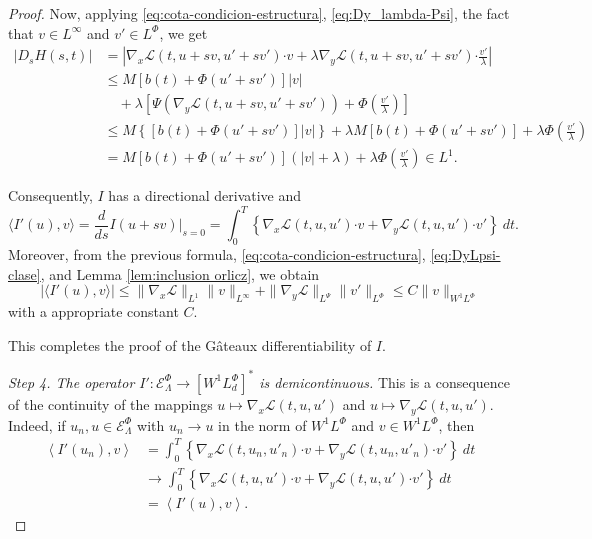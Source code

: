 \documentclass[twoside]{article}
\theoremstyle{remark}
\newcommand{\orlnor}{\|_{L^{\Phi}}}
\newcommand{\linf}{\|_{L^{\infty}}}
\newcommand{\lphi}{L^{\Phi}}
\newcommand{\lpsi}{L^{\Psi}}
\newcommand{\wphi}{W^{1}\lphi}
\newcommand{\sobnor}{\|_{W^{1}\lphi}}
\newcommand{\domi}{\mathcal{E}^{\Phi}}
\renewcommand{\b}[1]{\boldsymbol{#1}}
\newcommand{\ccdot}{\b{\cdot}}
\renewcommand{\leq}{\leqslant}
\begin{document}
\begin{proof}
Now, applying \eqref{eq:cota-condicion-estructura}, \eqref{eq:Dy_lambda-Psi},  
the fact that $v \in L^{\infty}$ and $v'\in\lphi$, 
we get
\begin{equation}\label{ctg}
\begin{split}
|D_s H(s,t)|&=\left| \nabla_x\mathcal{L}(t,u+sv,u'+sv')\ccdot v +  
\lambda \nabla_y\mathcal{L}(t, u+s v, u'+sv')\ccdot\frac{v'}{\lambda}\right| \\
  & \leq M \left[ b(t)+ \Phi(u'+sv')\right]|v|\\
 &\quad+ \lambda\left[\Psi(\nabla_y\mathcal{L}(t,u+sv,u'+sv'))+\Phi\left(\frac{v'}{\lambda}\right) \right]
\\
 &\leq M \left\{\left[ b(t)+ \Phi(u'+sv')\right]|v|\right\}+
 \lambda M[ b(t)+ \Phi(u'+sv')]+\lambda \Phi\left(\frac{v'}{\lambda}\right)
 \\
 &=
 M [ b(t)+ \Phi(u'+sv')] (|v|+\lambda) +\lambda \Phi\left(\frac{v'}{\lambda}\right)
 \in L^1.
\end{split}
\end{equation}

Consequently, $I$ has a directional derivative and
\[
\langle I'(u),v \rangle=\frac{d}{ds}I(u+s v)\big|_{s=0}=\int_0^T  
\left\{\nabla_x\mathcal{L}(t,u,u')\ccdot v+ \nabla_y\mathcal{L}(t,u,u')\ccdot v'\right\} \ dt.
\]
Moreover, from the previous formula, \eqref{eq:cota-condicion-estructura},  \eqref{eq:DyLpsi-clase}, and
Lemma \ref{lem:inclusion orlicz}, we obtain
\[
|\langle I'(u),v \rangle| \leq \|\nabla_x\mathcal{L}\|_{L^1} \| v\linf + 
\|\nabla_y\mathcal{L}\|_{\lpsi} \|v'\orlnor \leq C \|v\sobnor
\]
with a appropriate constant $C$.

This completes the proof of the G\^ateaux differentiability of $I$. 



\emph{Step 4. The operator $I':\domi_{\Lambda}  \to \left[\wphi_d
\right]^* $ is demicontinuous.}
This is a consequence  of the continuity of the mappings $u \mapsto \nabla_x\mathcal{L}(t,u,u')$ and $u \mapsto
\nabla_y\mathcal{L}(t,u,u')$. Indeed, if $u_n,u\in \domi_{\Lambda}$ with $u_n\to u$ in the norm of $\wphi$ and $v \in
\wphi$, then
\[
\begin{split}
\left\langle  I'(u_{n}),v \right\rangle &= \int_0^T \left\{  \nabla_x\mathcal{L}\left(t,u_n,u'_n\right)\ccdot
v +
 \nabla_y\mathcal{L}\left(t,u_n,u'_n\right)\ccdot v'\right\} \ dt\\
&\rightarrow \int_0^T \left\{ \nabla_x\mathcal{L}\left(t,u,u'\right)\ccdot v+ 
\nabla_y\mathcal{L}\left(t,u,u'\right)\ccdot v'\right\} \ dt\\
&=\left\langle  I'(u),v \right\rangle.
\end{split}
\]



\end{proof}
\end{document}
